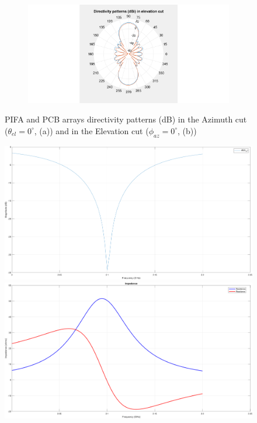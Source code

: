 \documentclass[12pt,a4paper]{article}
\begin{document}
{\begin{figure}[h]
\begin{center}
\begin{subfigure}{0.5\linewidth}
				\includegraphics[scale=0.3]{pifa_pcb_array_elevation_comparison.pdf}
				\caption{}	\end{subfigure}
			\caption{\selectfont
				\color{gray}
				PIFA and PCB arrays directivity patterns (dB) in the Azimuth cut  ($\theta_{el}=0^\circ$, (a)) and in the Elevation cut ($\phi_{az}=0^\circ$, (b))}
		\end{center}  
	\end{figure}
	
	\begin{center}
		\begin{figure}
			\includegraphics[width = 0.5\linewidth]{gamma.png}
			\includegraphics[width = 0.5\linewidth]{impedances.png}
		\end{figure}
	\end{center}
	
	
	
	
	
	
	
	
	
	
	
	
	
	
	
	
	
	
}
\end{document}
